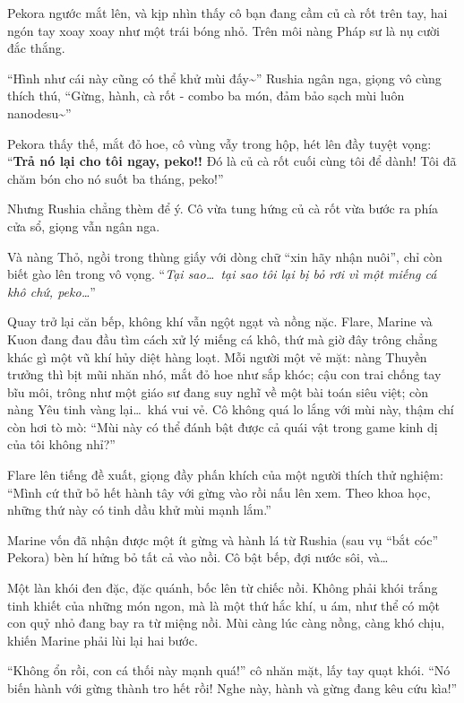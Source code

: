 \documentclass[../main.tex]{subfiles}
\begin{document}
Pekora ngước mắt lên, và kịp nhìn thấy cô bạn đang cầm củ cà rốt trên tay, hai ngón tay xoay xoay như một trái bóng nhỏ. Trên môi nàng Pháp sư là nụ cười đắc thắng.

``Hình như cái này cũng có thể khử mùi đấy\~{}'' Rushia ngân nga, giọng vô cùng thích thú, ``Gừng, hành, cà rốt - combo ba món, đảm bảo sạch mùi luôn nanodesu\~{}''


Pekora thấy thế, mắt đỏ hoe, cô vùng vẫy trong hộp, hét lên đầy tuyệt vọng: ``\textbf{Trả nó lại cho tôi ngay, peko!!} Đó là củ cà rốt cuối cùng tôi để dành! Tôi đã chăm bón cho nó suốt ba tháng, peko!''

Nhưng Rushia chẳng thèm để ý. Cô vừa tung hứng củ cà rốt vừa bước ra phía cửa sổ, giọng vẫn ngân nga.

Và nàng Thỏ, ngồi trong thùng giấy với dòng chữ ``xin hãy nhận nuôi'', chỉ còn biết gào lên trong vô vọng. ``\textit{Tại sao\dots\ tại sao tôi lại bị bỏ rơi vì một miếng cá khô chứ, peko\dots}''

\ct

Quay trở lại căn bếp, không khí vẫn ngột ngạt và nồng nặc. Flare, Marine và Kuon đang đau đầu tìm cách xử lý miếng cá khô, thứ mà giờ đây trông chẳng khác gì một vũ khí hủy diệt hàng loạt. Mỗi người một vẻ mặt: nàng Thuyền trưởng thì bịt mũi nhăn nhó, mắt đỏ hoe như sắp khóc; cậu con trai chống tay bĩu môi, trông như một giáo sư đang suy nghĩ về một bài toán siêu việt; còn nàng Yêu tinh vàng lại\dots\ khá vui vẻ. Cô không quá lo lắng với mùi này, thậm chí còn hơi tò mò: ``Mùi này có thể đánh bật được cả quái vật trong game kinh dị của tôi không nhỉ?''

Flare lên tiếng đề xuất, giọng đầy phấn khích của một người thích thử nghiệm: ``Mình cứ thử bỏ hết hành tây với gừng vào rồi nấu lên xem. Theo khoa học, những thứ này có tinh dầu khử mùi mạnh lắm.''

Marine vốn đã nhận được một ít gừng và hành lá từ Rushia (sau vụ ``bắt cóc'' Pekora) bèn hí hửng bỏ tất cả vào nồi. Cô bật bếp, đợi nước sôi, và\dots


Một làn khói đen đặc, đặc quánh, bốc lên từ chiếc nồi. Không phải khói trắng tinh khiết của những món ngon, mà là một thứ hắc khí, u ám, như thể có một con quỷ nhỏ đang bay ra từ miệng nồi. Mùi càng lúc càng nồng, càng khó chịu, khiến Marine phải lùi lại hai bước.

``Không ổn rồi, con cá thối này mạnh quá!'' cô nhăn mặt, lấy tay quạt khói. ``Nó biến hành với gừng thành tro hết rồi! Nghe này, hành và gừng đang kêu cứu kìa!''
\end{document}
